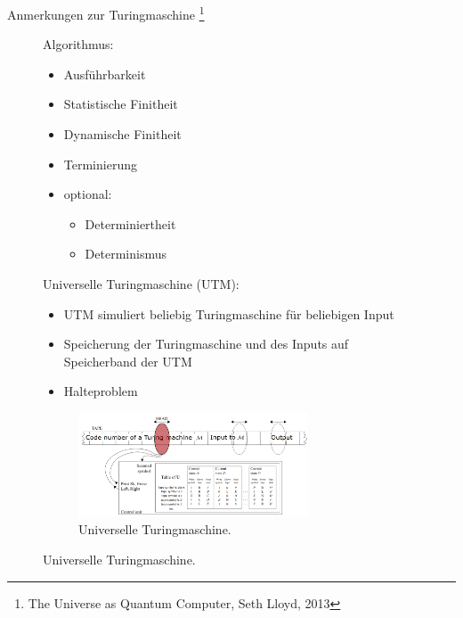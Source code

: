 \documentclass[aspectratio=1610, 9pt]{beamer}
\begin{document}
\begin{frame}{Anmerkungen zur Turingmaschine \footnote[8]{The Universe as Quantum Computer, Seth Lloyd, 2013}}
  \begin{figure}
    \begin{minipage}{0.29\textwidth}
      Algorithmus:
      \begin{itemize}
        \item Ausführbarkeit
        \item Statistische Finitheit
        \item Dynamische Finitheit
        \item Terminierung
        \item optional:
        \begin{itemize}
          \item[\bullet] Determiniertheit
          \item[\bullet] Determinismus
        \end{itemize}
      \end{itemize}
    \end{minipage}
    \hfill
    \begin{minipage}{0.69\textwidth}
      Universelle Turingmaschine (UTM):
      \begin{itemize}
        \item UTM simuliert beliebig Turingmaschine für beliebigen Input
        \item Speicherung der Turingmaschine und des Inputs auf Speicherband der UTM
        \item[\rightarrow] Halteproblem
      \end{itemize}
      \begin{figure}
        \includegraphics[width=0.75\textwidth]{images/UTM.png}
        \caption{Universelle Turingmaschine. \footnotemark[10]}
      \end{figure}
    \end{minipage}
  \end{figure}
\end{frame}
\end{document}
